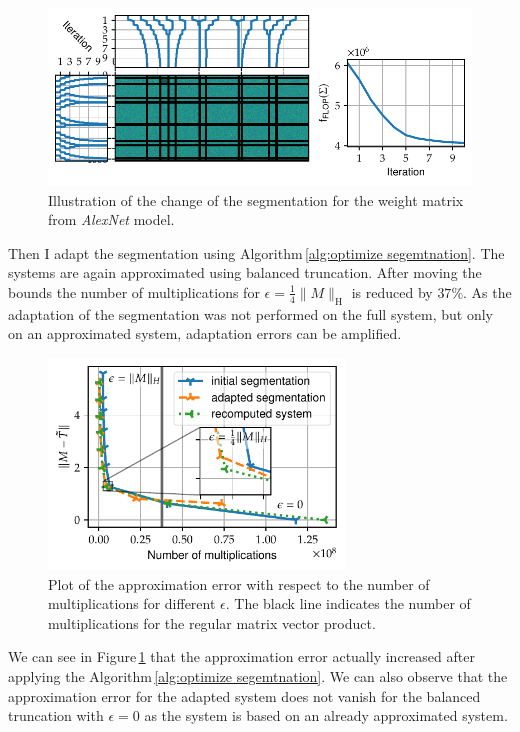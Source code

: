 \documentclass[numbers=noenddot,doctype=mastersthesis,BCOR=15mm,biblatex]{ldvbook}%
\begin{document}
\begin{figure}[!htb]
	\centering
	\includegraphics[width=\textwidth]{Plots/move_example_alexnet_comp.pdf}
	\caption{Illustration of the change of the segmentation for the weight matrix from \emph{AlexNet} model.
	}
	\label{fig:alexnet_seperation_comp}
\end{figure}
Then I adapt the segmentation using Algorithm\,\ref{alg:optimize segemtnation}.
The systems are again approximated using balanced truncation.
After moving the bounds the number of multiplications for $\epsilon = \frac{1}{4}\|M\|_\text{H}$ is reduced by $37\%$.
As the adaptation of the segmentation was not performed on the full system, but only on an approximated system, adaptation errors can be amplified.
\begin{figure}[!htb]
	\centering
	\includegraphics[width=0.7\textwidth]{Plots/move_example_alexnet_error.pdf}
	\caption{Plot of the approximation error with respect to the number of multiplications for different $\epsilon$. 
		The black line indicates the number of multiplications for the regular matrix vector product. 
	}
	\label{fig:allexnet_err_cost}
\end{figure}
We can see in Figure\,\ref{fig:alexnet_seperation_comp} that the approximation error actually increased after applying the Algorithm\,\ref{alg:optimize segemtnation}.
We can also observe that the approximation error for the adapted system does not vanish for the balanced truncation with $\epsilon = 0$ as the system is based on an already approximated system.
\end{document}
